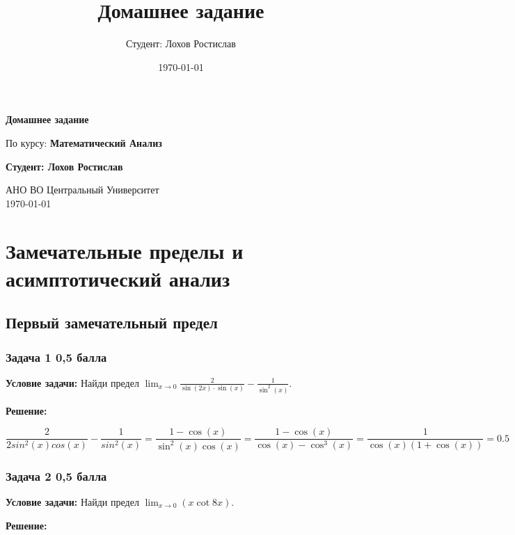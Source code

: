 \documentclass[a4paper,12pt]{article}
\title{Домашнее задание}
\author{Студент: Лохов Ростислав}
\date{\today}
\begin{document}
\begin{titlepage}
    \centering
    \vspace*{1cm}

    \Huge
    \textbf{Домашнее задание}

    \vspace{0.5cm}
    \LARGE
    По курсу: \textbf{Математический Анализ}

    \vspace{1.5cm}

    \textbf{Студент: Лохов Ростислав}

    \vfill

    \Large
    АНО ВО Центральный Университет\\
    \vspace{0.3cm}
    \today

\end{titlepage}

\tableofcontents
\newpage

\section{Замечательные пределы и асимптотический анализ}

\subsection{Первый замечательный предел}

\subsubsection{Задача 1 \hfill 0,5 балла}
\textbf{Условие задачи:} Найди предел $\lim_{x \to 0} \frac{2}{\sin(2x)\cdot \sin(x)} - \frac{1}{\sin^2(x)}$.

\textbf{Решение: } 

\[
\frac{2}{2sin^2(x)cos(x)}-\frac{1}{sin^2(x)} = \frac{1-\cos(x)}{\sin^2(x)\cos(x)} = \frac{1-\cos(x)}{\cos(x)-\cos^3(x)} = \frac{1}{\cos(x)(1+\cos(x))} = 0.5
\]

\vspace{1cm}

\subsubsection{Задача 2 \hfill 0,5 балла}
\textbf{Условие задачи:} Найди предел \( \lim_{x \to 0} \left( x \cot 8x \right) \).

\textbf{Решение: } 
\end{document}
